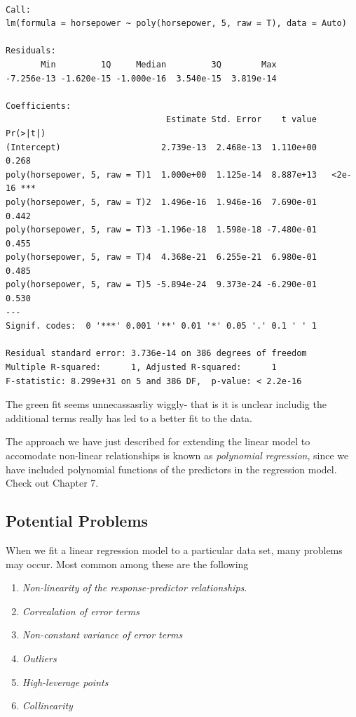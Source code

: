\documentclass[
  letterpaper,
  DIV=11,
  numbers=noendperiod]{scrreprt}
\begin{document}
\begin{verbatim}

Call:
lm(formula = horsepower ~ poly(horsepower, 5, raw = T), data = Auto)

Residuals:
       Min         1Q     Median         3Q        Max 
-7.256e-13 -1.620e-15 -1.000e-16  3.540e-15  3.819e-14 

Coefficients:
                                Estimate Std. Error    t value Pr(>|t|)    
(Intercept)                    2.739e-13  2.468e-13  1.110e+00    0.268    
poly(horsepower, 5, raw = T)1  1.000e+00  1.125e-14  8.887e+13   <2e-16 ***
poly(horsepower, 5, raw = T)2  1.496e-16  1.946e-16  7.690e-01    0.442    
poly(horsepower, 5, raw = T)3 -1.196e-18  1.598e-18 -7.480e-01    0.455    
poly(horsepower, 5, raw = T)4  4.368e-21  6.255e-21  6.980e-01    0.485    
poly(horsepower, 5, raw = T)5 -5.894e-24  9.373e-24 -6.290e-01    0.530    
---
Signif. codes:  0 '***' 0.001 '**' 0.01 '*' 0.05 '.' 0.1 ' ' 1

Residual standard error: 3.736e-14 on 386 degrees of freedom
Multiple R-squared:      1, Adjusted R-squared:      1 
F-statistic: 8.299e+31 on 5 and 386 DF,  p-value: < 2.2e-16
\end{verbatim}

The green fit seems unnecassasrliy wiggly- that is it is unclear
includig the additional terms really has led to a better fit to the
data.

The approach we have just described for extending the linear model to
accomodate non-linear relationships is known as \emph{polynomial
regression}, since we have included polynomial functions of the
predictors in the regression model. Check out Chapter 7.

\hypertarget{potential-problems}{%
\subsection{Potential Problems}\label{potential-problems}}

When we fit a linear regression model to a particular data set, many
problems may occur. Most common among these are the following

\begin{enumerate}
\def\labelenumi{\arabic{enumi}.}
\item
  \emph{Non-linearity of the response-predictor relationships}.
\item
  \emph{Correalation of error terms}
\item
  \emph{Non-constant variance of error terms}
\item
  \emph{Outliers}
\item
  \emph{High-leverage points}
\item
  \emph{Collinearity}
\end{enumerate}
\end{document}

